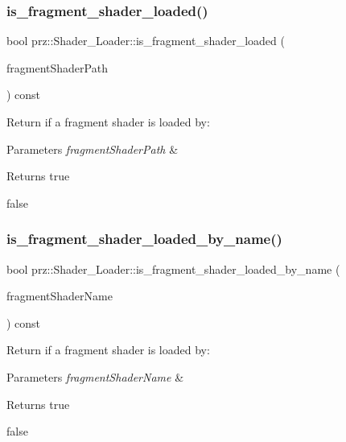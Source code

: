 \subsubsection{\texorpdfstring{is\_fragment\_shader\_loaded()}{is\_fragment\_shader\_loaded()}}
{\footnotesize\ttfamily bool prz\+::\+Shader\+\_\+\+Loader\+::is\+\_\+fragment\+\_\+shader\+\_\+loaded (\begin{DoxyParamCaption}\item[{const P\+String \&}]{fragment\+Shader\+Path }\end{DoxyParamCaption}) const\hspace{0.3cm}{\ttfamily [inline]}}



Return if a fragment shader is loaded by\+: 


\begin{DoxyParams}{Parameters}
{\em fragment\+Shader\+Path} & \\
\hline
\end{DoxyParams}
\begin{DoxyReturn}{Returns}
true 

false 
\end{DoxyReturn}
\mbox{\label{classprz_1_1_shader___loader_a2eea0d7674cfde8826965665c19c44c7}} 
\subsubsection{\texorpdfstring{is\_fragment\_shader\_loaded\_by\_name()}{is\_fragment\_shader\_loaded\_by\_name()}}
{\footnotesize\ttfamily bool prz\+::\+Shader\+\_\+\+Loader\+::is\+\_\+fragment\+\_\+shader\+\_\+loaded\+\_\+by\+\_\+name (\begin{DoxyParamCaption}\item[{const P\+String \&}]{fragment\+Shader\+Name }\end{DoxyParamCaption}) const\hspace{0.3cm}{\ttfamily [inline]}}



Return if a fragment shader is loaded by\+: 


\begin{DoxyParams}{Parameters}
{\em fragment\+Shader\+Name} & \\
\hline
\end{DoxyParams}
\begin{DoxyReturn}{Returns}
true 

false 
\end{DoxyReturn}
\mbox{\label{classprz_1_1_shader___loader_a3e3cd98317d6006182fd03cfbf29b468}} 
